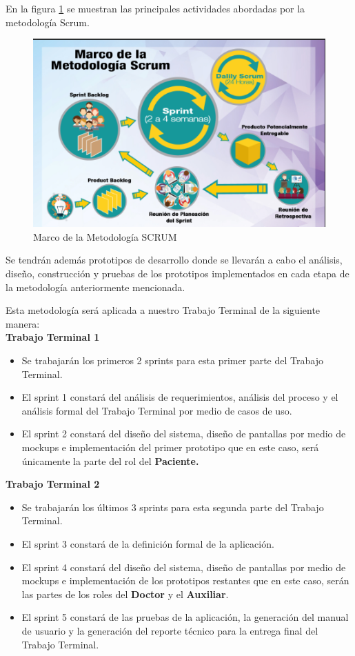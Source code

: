 En la figura \ref{fig:metodologiaSCRUM} se muestran las principales actividades abordadas por la metodología Scrum.

\begin{figure}[htb]
	\centering
	\includegraphics[width=1\textwidth]{images/introduccion/scrum}
	\caption{Marco de la Metodología SCRUM} \label{fig:metodologiaSCRUM}
\end{figure}

Se tendrán además prototipos de desarrollo donde se llevarán a cabo el análisis, diseño, construcción y pruebas de los prototipos implementados en cada etapa de la metodología anteriormente mencionada.

Esta metodología será aplicada a nuestro Trabajo Terminal de la siguiente manera:\\

\textbf{Trabajo Terminal 1}
\begin{itemize}
	\item Se trabajarán los primeros 2 sprints para esta primer parte del Trabajo Terminal.
	\item El sprint 1 constará del análisis de requerimientos, análisis del proceso y el análisis formal del Trabajo Terminal por medio de casos de uso.
	\item El sprint 2 constará del diseño del sistema, diseño de pantallas por medio de mockups e implementación del primer prototipo que en este caso, será únicamente la parte del rol del \textbf{Paciente.}
\end{itemize}

\textbf{Trabajo Terminal 2}
\begin{itemize}
	\item Se trabajarán los últimos 3 sprints para esta segunda parte del Trabajo Terminal.
	\item El sprint 3 constará de la definición formal de la aplicación.
	\item El sprint 4 constará del diseño del sistema, diseño de pantallas por medio de mockups e implementación de los prototipos restantes que en este caso, serán las partes de los roles del \textbf{Doctor} y el \textbf{Auxiliar}.
	\item El sprint 5 constará de las pruebas de la aplicación, la generación del manual de usuario y la generación del reporte técnico para la entrega final del Trabajo Terminal.
\end{itemize}




